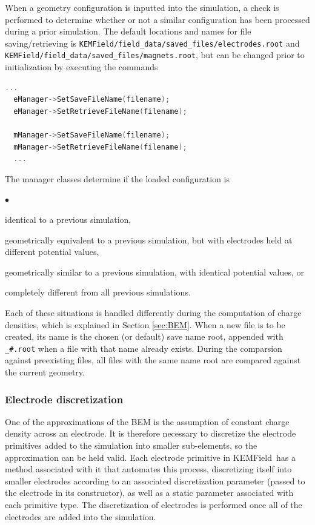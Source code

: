 \documentclass[11pt,a4paper,oneside]{article}
\newcommand{\kemfield}    {{\sc KEMField}}
\newcommand{\squishlist}{
   \begin{list}{$\bullet$}
    { \setlength{\itemsep}{0pt}      \setlength{\parsep}{3pt}
      \setlength{\topsep}{3pt}       \setlength{\partopsep}{0pt}
      \setlength{\leftmargin}{1.5em} \setlength{\labelwidth}{1em}
      \setlength{\labelsep}{0.5em} } }
\newcommand{\squishend}{
    \end{list}  }
\begin{document}
When a geometry configuration is inputted into the simulation, a check is performed to determine whether or not a similar configuration has been processed during a prior simulation.  The default locations and names for file saving/retrieving is \texttt{KEMField/field\_data/saved\_files/electrodes.root} and \texttt{KEMField/field\_data/saved\_files/magnets.root}, but can be changed prior to initialization by executing the commands
%
\begin{lstlisting}[language=C++]
  ...
  eManager->SetSaveFileName(filename);
  eManager->SetRetrieveFileName(filename);

  mManager->SetSaveFileName(filename);
  mManager->SetRetrieveFileName(filename);
  ...
\end{lstlisting}
%
The manager classes determine if the loaded configuration is
%
\squishlist
\item identical to a previous simulation, 
\item geometrically equivalent to a previous simulation, but with electrodes held at different potential values, 
\item geometrically similar to a previous simulation, with identical potential values, or 
\item completely different from all previous simulations.
\squishend
%
Each of these situations is handled differently during the computation of charge densities, which is explained in Section \ref{sec:BEM}.  When a new file is to be created, its name is the chosen (or default) save name root, appended with \texttt{\_\#.root} when a file with that name already exists.  During the comparsion against preexisting files, all files with the same name root are compared against the current geometry.  

\subsubsection{Electrode discretization}
\label{subsubsec:electrodeDiscretization}

One of the approximations of the BEM is the assumption of constant charge density across an electrode.  It is therefore necessary to discretize the electrode primitives added to the simulation into smaller sub-elements, so the approximation can be held valid.  Each electrode primitive in \kemfield\ has a method associated with it that automates this process, discretizing itself into smaller electrodes according to an associated discretization parameter (passed to the electrode in its constructor), as well as a static parameter associated with each primitive type.  The discretization of electrodes is performed once all of the electrodes are added into the simulation.  
\end{document}
